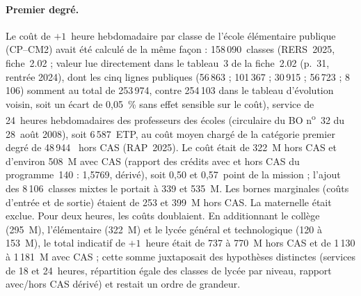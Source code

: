 \documentclass[11pt,a4paper]{article}
\providecommand{\euro}{\texteuro}
\begin{document}
\paragraph{Premier degré.} Le coût de $+1$~heure hebdomadaire par classe de l'école élémentaire publique (CP--CM2) avait été calculé de la même façon : 158\,090~classes (RERS~2025, fiche~2.02 ; valeur lue directement dans le tableau~3 de la fiche~2.02 (p.~31, rentrée 2024), dont les cinq lignes publiques (56\,863 ; 101\,367 ; 30\,915 ; 56\,723 ; 8\,106) somment au total de 253\,974, contre 254\,103 dans le tableau d'évolution voisin, soit un écart de 0,05~\% sans effet sensible sur le coût), service de 24~heures hebdomadaires des professeurs des écoles (circulaire du BO n\textsuperscript{o}~32 du 28~août 2008), soit 6\,587~ETP, au coût moyen chargé de la catégorie premier degré de 48\,944~\euro{} hors CAS (RAP~2025). Le coût était de 322~M\euro{} hors CAS et d'environ 508~M\euro{} avec CAS (rapport des crédits avec et hors CAS du programme~140 : 1,5769, dérivé), soit 0,50 et 0,57~point de la mission ; l'ajout des 8\,106~classes mixtes le portait à 339 et 535~M\euro{}. Les bornes marginales (coûts d'entrée et de sortie) étaient de 253 et 399~M\euro{} hors CAS. La maternelle était exclue. Pour deux heures, les coûts doublaient. En additionnant le collège (295~M\euro{}), l'élémentaire (322~M\euro{}) et le lycée général et technologique (120 à 153~M\euro{}), le total indicatif de $+1$~heure était de 737 à 770~M\euro{} hors CAS et de 1\,130 à 1\,181~M\euro{} avec CAS ; cette somme juxtaposait des hypothèses distinctes (services de 18 et 24~heures, répartition égale des classes de lycée par niveau, rapport avec/hors CAS dérivé) et restait un ordre de grandeur.
\end{document}
